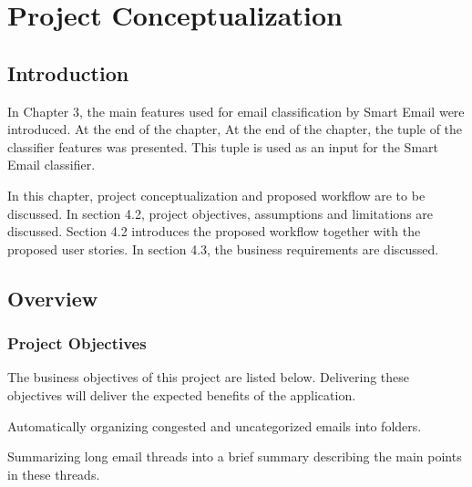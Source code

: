
\chapter{Project Conceptualization} %

\label{Chapter4} %


\section{Introduction}
In Chapter 3, the main features used for email classification by Smart Email were introduced. At the end of the chapter, At the end of the chapter, the tuple of the classifier features was presented. This tuple is used as an input for the Smart Email classifier.

In this chapter, project conceptualization and proposed workflow are to be discussed. In section 4.2, project objectives, assumptions and limitations are discussed. Section 4.2 introduces the proposed workflow together with the proposed user stories. In section 4.3, the business requirements are discussed. 

\section{Overview}

\subsection{Project Objectives}
The business objectives of this project are listed below. Delivering these 
objectives will deliver the expected benefits of the application.
\begin{my_itemize}
  \item Automatically organizing congested and uncategorized emails into folders.
  \item Summarizing long email threads into a brief summary describing the 
	main points in these threads.
\end{my_itemize}



